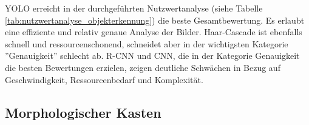 \begin{table}[H]
    \caption{Nutzwertanalyse Objekterkennung}
    \label{tab:nutzwertanalyse_objekterkennung}
\end{table}

YOLO erreicht in der durchgeführten Nutzwertanalyse (siehe Tabelle \ref{tab:nutzwertanalyse_objekterkennung}) die beste Gesamtbewertung. Es erlaubt eine effiziente und relativ genaue Analyse der Bilder.
Haar-Cascade ist ebenfalls schnell und ressourcenschonend, schneidet aber in der wichtigsten Kategorie ''Genauigkeit'' schlecht ab.
R-CNN und CNN, die in der Kategorie Genauigkeit die besten Bewertungen erzielen, zeigen deutliche Schwächen in Bezug auf Geschwindigkeit, Ressourcenbedarf und Komplexität.

\subsection{Morphologischer Kasten}
        